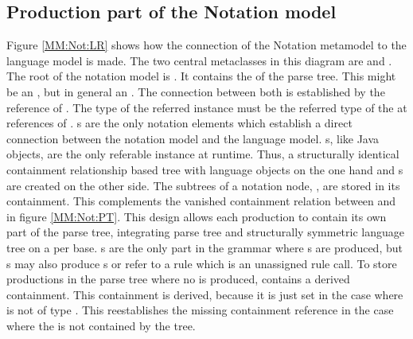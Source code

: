 \subsection{Production part of the Notation model} \label{sec:MM:Not:Prod}
Figure \ref{MM:Not:LR} shows how the connection of the Notation metamodel to the language model is made. The two central metaclasses in this diagram are  and . The root of the notation model is . It contains the  of the parse tree. This might be an , but in general an . The connection between both is established by the reference  of .  The type of the referred instance must be the referred type of the  at  references of . s are the only notation elements which establish a direct connection between the notation model and the language model. s, like Java objects, are the only referable instance at runtime. Thus, a structurally identical containment relationship based tree with language objects on the one hand and s are created on the other side. The subtrees of a notation node, , are stored in its  containment. This complements the vanished containment relation between  and  in figure \ref{MM:Not:PT}. This design allows each  production to contain its own part of the parse tree, integrating parse tree and structurally symmetric language tree on a per  base. s are the only part in the grammar where s are produced, but s may also produce s or refer to a rule which is an unassigned rule call. To store productions in the parse tree where no  is produced,  contains a derived  containment. This containment is derived, because it is just set in the case where  is not of type . This reestablishes the missing containment reference in the case where the  is not contained by the  tree. \\
